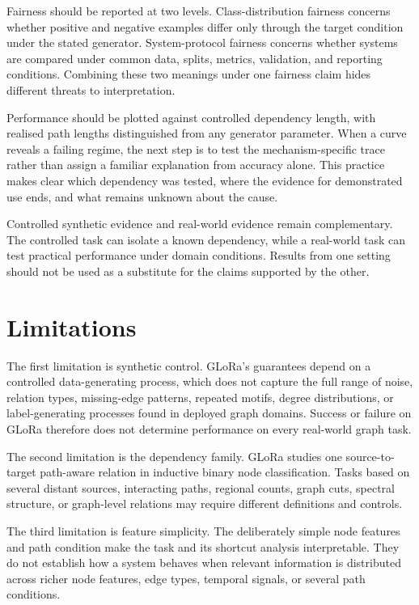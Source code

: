 Fairness should be reported at two levels.
Class-distribution fairness concerns whether positive and negative examples differ only through the target condition under the stated generator.
System-protocol fairness concerns whether systems are compared under common data, splits, metrics, validation, and reporting conditions.
Combining these two meanings under one fairness claim hides different threats to interpretation.

Performance should be plotted against controlled dependency length, with realised path lengths distinguished from any generator parameter.
When a curve reveals a failing regime, the next step is to test the mechanism-specific trace rather than assign a familiar explanation from accuracy alone.
This practice makes clear which dependency was tested, where the evidence for demonstrated use ends, and what remains unknown about the cause.

Controlled synthetic evidence and real-world evidence remain complementary.
The controlled task can isolate a known dependency, while a real-world task can test practical performance under domain conditions.
Results from one setting should not be used as a substitute for the claims supported by the other.

\section{Limitations}

The first limitation is synthetic control.
GLoRa's guarantees depend on a controlled data-generating process, which does not capture the full range of noise, relation types, missing-edge patterns, repeated motifs, degree distributions, or label-generating processes found in deployed graph domains.
Success or failure on GLoRa therefore does not determine performance on every real-world graph task.

The second limitation is the dependency family.
GLoRa studies one source-to-target path-aware relation in inductive binary node classification.
Tasks based on several distant sources, interacting paths, regional counts, graph cuts, spectral structure, or graph-level relations may require different definitions and controls.

The third limitation is feature simplicity.
The deliberately simple node features and path condition make the task and its shortcut analysis interpretable.
They do not establish how a system behaves when relevant information is distributed across richer node features, edge types, temporal signals, or several path conditions.

